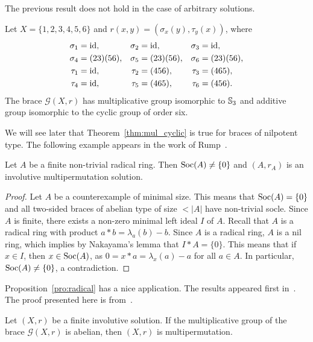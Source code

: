 The previous result does not hold in the case of arbitrary solutions.

\begin{example}
Let $X=\{1,2,3,4,5,6\}$ and $r(x,y)=(\sigma_x(y),\tau_y(x))$, where
\begin{align*}
    \sigma_1 &= \operatorname{id}, & \sigma_2&=\operatorname{id}, & \sigma_3 &= \operatorname{id},\\
    \sigma_4&=(23)(56), &\sigma_5 &= (23)(56), & \sigma_6&=(23)(56),\\
    \tau_1 &= \operatorname{id}, & \tau_2&=(456), & \tau_3 &= (465),\\
    \tau_4&=\operatorname{id}, &\tau_5 &= (465), & \tau_6&=(456).
\end{align*}
The brace $\mathcal{G}(X,r)$ has multiplicative group isomorphic to $\mathbb{S}_3$ and
additive group isomorphic to the cyclic group of order six. 
\end{example}

We will see later that Theorem~\ref{thm:mul_cyclic}
is true for braces of nilpotent type. 
The following example appears in the work of Rump~\cite{MR2278047}.

\begin{proposition}
\label{pro:radical}
Let $A$ be a finite non-trivial radical ring. Then $\operatorname{Soc}(A)\ne\{0\}$ and 
$(A,r_A)$ is an involutive multipermutation solution. 
\end{proposition}

\begin{proof}
Let $A$ be a counterexample of minimal size. This means that $\operatorname{Soc}(A)=\{0\}$ 
and all two-sided braces of abelian type of size $<|A|$ have non-trivial socle. 
Since $A$ is finite, there exists a non-zero minimal left ideal $I$ of $A$.
Recall that $A$ is a radical ring with product $a*b=\lambda_a(b)-b$. 
Since $A$ is a radical ring, $A$ is a nil ring, which implies by 
Nakayama's lemma that $I*A=\{0\}$. This means that if $x\in I$, 
then $x\in\operatorname{Soc}(A)$, as $0=x*a=\lambda_x(a)-a$ for all $a\in A$. 
In particular, $\operatorname{Soc}(A)\ne\{0\}$, a contradiction. 
\end{proof}

Proposition~\ref{pro:radical} has a nice application. The results appeared first in~\cite{MR2652212}. 
The proof presented here is from~\cite{MR3177933}. 

\begin{theorem}
\label{thm:CJO_abelian}
    Let $(X,r)$ be a finite involutive solution. If the multiplicative group of the brace 
    $\mathcal{G}(X,r)$ is abelian, then $(X,r)$ is multipermutation. 
\end{theorem}

